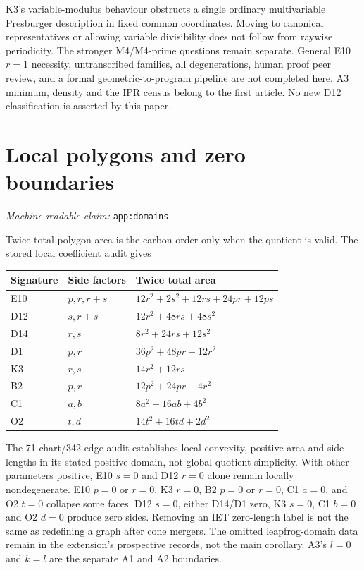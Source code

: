 \documentclass[11pt]{amsart}
\newcommand{\record}[1]{\nolinkurl{#1}}
\newcommand{\claimid}[1]{\par\nopagebreak\noindent\textit{Machine-readable claim:} \record{#1}.\par}
\theoremstyle{definition}\newtheorem{definition}{Definition}
\begin{document}
K3's variable-modulus behaviour obstructs a single ordinary
multivariable Presburger description in fixed common coordinates.
Moving to canonical representatives or allowing variable divisibility
does not follow from raywise periodicity. The stronger M4/M4-prime
questions remain separate. General E10 $r=1$ necessity, untranscribed
families, all degenerations, human proof peer review, and a formal
geometric-to-program pipeline are not completed here. A3 minimum,
density and the IPR census belong to the first article. No new D12
classification is asserted by this paper.

\appendix
\section{Local polygons and zero boundaries}\label{app:domains}
\claimid{app:domains}
Twice total polygon area is the carbon order only when the quotient
is valid. The stored local coefficient audit gives
\begin{center}\small
\begin{tabular}{lll}\toprule
Signature & Side factors & Twice total area\\\midrule
E10 & $p,r,r+s$ & $12r^2+2s^2+12rs+24pr+12ps$\\
D12 & $s,r+s$ & $12r^2+48rs+48s^2$\\
D14 & $r,s$ & $8r^2+24rs+12s^2$\\
D1 & $p,r$ & $36p^2+48pr+12r^2$\\
K3 & $r,s$ & $14r^2+12rs$\\
B2 & $p,r$ & $12p^2+24pr+4r^2$\\
C1 & $a,b$ & $8a^2+16ab+4b^2$\\
O2 & $t,d$ & $14t^2+16td+2d^2$\\\bottomrule
\end{tabular}
\end{center}
The 71-chart/342-edge audit establishes local convexity, positive area
and side lengths in its stated positive domain, not global quotient
simplicity. With other parameters positive, E10 $s=0$ and D12 $r=0$
alone remain locally nondegenerate. E10 $p=0$ or $r=0$, K3 $r=0$,
B2 $p=0$ or $r=0$, C1 $a=0$, and O2 $t=0$ collapse some faces.
D12 $s=0$, either D14/D1 zero, K3 $s=0$, C1 $b=0$ and O2 $d=0$
produce zero sides. Removing an IET zero-length label is not the same
as redefining a graph after cone mergers. The omitted leapfrog-domain
data remain in the extension's prospective records, not the main
corollary. A3's $l=0$ and $k=l$ are the separate A1 and A2 boundaries.
\end{document}
